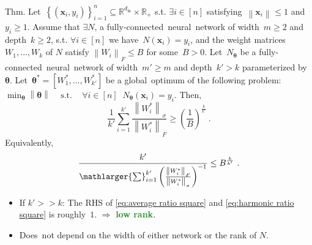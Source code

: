 \documentclass[handout,usenames,dvipsnames]{beamer} %
\newcommand{\din}{{d_{\text{in}}}}
\newcommand{\norm}[2][]{{\left\|{#2}\right\|_{#1}}}
\newcommand{\bx}{\mathbf{x}}
\newcommand{\btheta}{{\boldsymbol{\theta}}}
\newcommand{\reals}{{\mathbb R}}
\newcommand{\true}[1]{{\textcolor{ForestGreen}{\textbf{#1}}}}
\begin{document}
\begin{frame}
    \begin{exampleblock}{Thm. \hfill\checkmark}
        Let~$\left\{ \left( \bx_i, y_i \right) \right\}_{i=1}^n \subseteq \mathbb{R}^{\din} \times \reals_+$ s.t. $\exists i \in [n]$ satisfying~$\norm{\bx_i} \leq 1$ and $y_i \geq 1$. 
        \pause
        Assume that $\exists N$, a fully-connected~neural~network of width~$m \geq 2$ and depth~$k \geq 2$, s.t. $\forall i \in [n]$ we have~$N(\bx_i) = y_i$, and the weight matrices $W_1,\ldots,W_k$ of $N$ satisfy $\norm{W_i}_F \leq B$ for some~$B>0$.
        \pause
        Let~$N_\btheta$ be a fully-connected~neural~network of width~$m' \geq m$ and depth~$k' > k$ parameterized by~$\btheta$.
        \pause
        Let~$\btheta^* = \left[W_1^*,\ldots,W_{k'}^*\right]$ be a global~optimum of the following problem: $\min_\btheta \norm{\btheta} \;\;\;\; \text{s.t. } \;\;\; \forall i \in [n] \;\; N_\btheta(\bx_i)=y_i$.
        \pause
        Then, 
        \setcounter{equation}{0}
        {\setlength{\abovedisplayskip}{0pt}
        \setlength{\belowdisplayskip}{0pt}
        \begin{equation}  \label{eq:average ratio square}
            \frac{1}{k'}\sum_{i=1}^{k'} \frac{\norm{W_i^*}_\sigma}{\norm{W_i^*}_F} 
            \geq \left( \frac{1}{B} \right)^{\frac{k}{k'}}~.
        \end{equation}
        Equivalently,
        \begin{equation}  \label{eq:harmonic ratio square}
            \frac{k'}{\mathlarger{\sum}_{i=1}^{k'} \left( \frac{\norm{W_i^*}_F}{\norm{W_i^*}_\sigma} \right)^{-1} }
            \leq 
            B^{\frac{k}{k'}}~.
        \end{equation}
        }
    \end{exampleblock}
    \pause
    \begin{itemize}
        \item If $k' >> k$: The RHS of \eqref{eq:average ratio square} and \eqref{eq:harmonic ratio square} is roughly~$1$. 
        \pause
        $\Rightarrow$ \true{low rank}.
        \pause
        \item Does~not depend on the width of either network or the rank of $N$.
    \end{itemize}
    

\end{frame}
\end{document}
